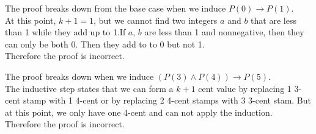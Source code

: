 \documentclass[12pt]{exam}
\begin{document}
\begin{solution}
    \begin{qparts}
        \item 
            The proof breaks down from the base case when we induce $P(0) \rightarrow P(1)$.\\
            At this point, $k + 1 = 1$, but we cannot find 
            two integers $a$ and $b$ that are less than 1 while they add up to 1.If $a$, $b$ are less than 1 and nonnegative, 
            then they can only be both 0. Then they add to to 0 but not 1.\\
            Therefore the proof is incorrect.

        \item 
            The proof breaks down when we induce $(P(3) \land P(4)) \rightarrow P(5)$.\\
            The inductive step states that we can form a $k + 1$ cent value by 
            replacing 1 3-cent stamp with 1 4-cent or by replacing 2 4-cent stamps with 3 3-cent stam. 
            But at this point, we only have one 4-cent and can not apply the induction.\\
            Therefore the proof is incorrect.
            
    \end{qparts}
\end{solution}
\end{document}
